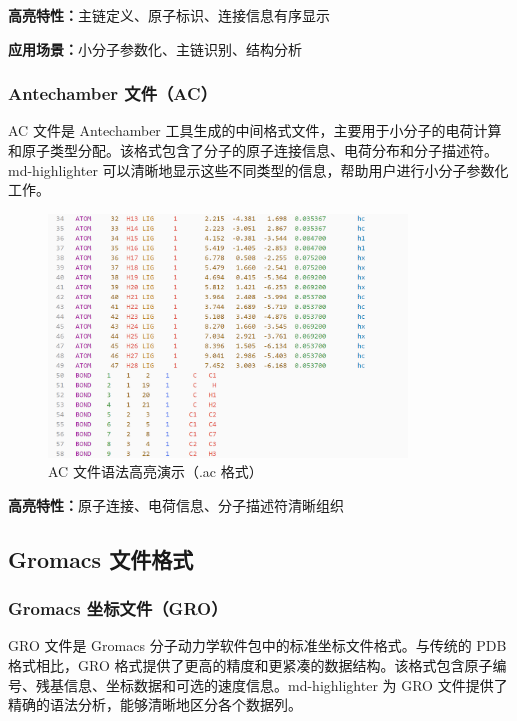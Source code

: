 \textbf{高亮特性：}主链定义、原子标识、连接信息有序显示

\textbf{应用场景：}小分子参数化、主链识别、结构分析

\subsubsection{Antechamber 文件（AC）}

AC 文件是 Antechamber 工具生成的中间格式文件，主要用于小分子的电荷计算和原子类型分配。该格式包含了分子的原子连接信息、电荷分布和分子描述符。md-highlighter 可以清晰地显示这些不同类型的信息，帮助用户进行小分子参数化工作。

\begin{figure}[!h]
    \centering
    \includegraphics[width=0.85\textwidth]{../images/ac.png}
    \caption{AC 文件语法高亮演示（.ac 格式）}
    \label{fig:ac-highlighting}
\end{figure}

\textbf{高亮特性：}原子连接、电荷信息、分子描述符清晰组织

\subsection{Gromacs 文件格式}

\subsubsection{Gromacs 坐标文件（GRO）}

GRO 文件是 Gromacs 分子动力学软件包中的标准坐标文件格式。与传统的 PDB 格式相比，GRO 格式提供了更高的精度和更紧凑的数据结构。该格式包含原子编号、残基信息、坐标数据和可选的速度信息。md-highlighter 为 GRO 文件提供了精确的语法分析，能够清晰地区分各个数据列。

